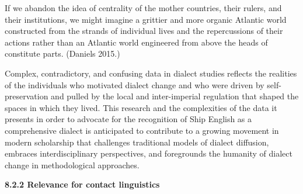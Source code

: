 \begin{styleStandard}
If we abandon the idea of centrality of the mother countries, their rulers, and their institutions, we might imagine a grittier and more organic Atlantic world constructed from the strands of individual lives and the repercussions of their actions rather than an Atlantic world engineered from above the heads of constitute parts. (Daniels 2015.)
\end{styleStandard}

\begin{styleStandard}
Complex, contradictory, and confusing data in dialect studies reflects the realities of the individuals who motivated dialect change and who were driven by self-preservation and pulled by the local and inter-imperial regulation that shaped the spaces in which they lived. This research and the complexities of the data it presents in order to advocate for the recognition of Ship English as a comprehensive dialect is anticipated to contribute to a growing movement in modern scholarship that challenges traditional models of dialect diffusion, embraces interdisciplinary perspectives, and foregrounds the humanity of dialect change in methodological approaches. 
\end{styleStandard}

\begin{styleStandard}
\textbf{8.2.2 Relevance for contact linguistics}
\end{styleStandard}

